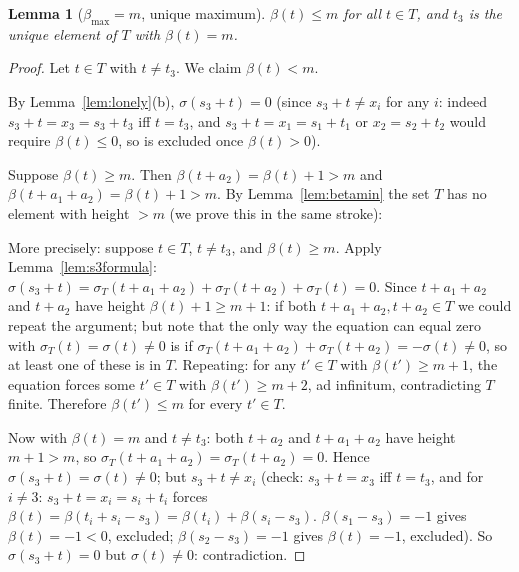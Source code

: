 \documentclass{article}
\newtheorem{lemma}{Lemma}
\begin{document}
\begin{lemma}[$\beta_{\max}=m$, unique maximum]\label{lem:betamax}
$\beta(t)\le m$ for all $t\in T$, and $t_3$ is the \emph{unique} element of $T$
with $\beta(t)=m$.
\end{lemma}
\begin{proof}
Let $t\in T$ with $t\ne t_3$.  We claim $\beta(t)<m$.

By Lemma~\ref{lem:lonely}(b), $\sigma(s_3+t)=0$
(since $s_3+t\ne x_i$ for any $i$: indeed $s_3+t=x_3=s_3+t_3$ iff $t=t_3$, and
$s_3+t=x_1=s_1+t_1$ or $x_2=s_2+t_2$ would require $\beta(t)\le 0$, so is
excluded once $\beta(t)>0$).

Suppose $\beta(t)\ge m$.  Then $\beta(t+a_2)=\beta(t)+1>m$ and
$\beta(t+a_1+a_2)=\beta(t)+1>m$.  By Lemma~\ref{lem:betamin} the
set $T$ has no element with height $>m$ (we prove this in the same stroke):

More precisely: suppose $t\in T$, $t\ne t_3$, and $\beta(t)\ge m$.
Apply Lemma~\ref{lem:s3formula}: $\sigma(s_3+t)=\sigma_T(t+a_1+a_2)+\sigma_T(t+a_2)+\sigma_T(t)=0$.
Since $t+a_1+a_2$ and $t+a_2$ have height $\beta(t)+1\ge m+1$:
if both $t+a_1+a_2,t+a_2\in T$ we could repeat the argument;
but note that the only way the equation can equal zero with $\sigma_T(t)=\sigma(t)\ne 0$ is
if $\sigma_T(t+a_1+a_2)+\sigma_T(t+a_2)=-\sigma(t)\ne 0$, so at least one of these is in $T$.
Repeating: for any $t'\in T$ with $\beta(t')\ge m+1$, the equation forces some
$t'\in T$ with $\beta(t')\ge m+2$, ad infinitum, contradicting $T$ finite.
Therefore $\beta(t')\le m$ for every $t'\in T$.

Now with $\beta(t)=m$ and $t\ne t_3$: both $t+a_2$ and $t+a_1+a_2$ have height $m+1>m$,
so $\sigma_T(t+a_1+a_2)=\sigma_T(t+a_2)=0$.
Hence $\sigma(s_3+t)=\sigma(t)\ne 0$; but $s_3+t\ne x_i$ (check: $s_3+t=x_3$ iff $t=t_3$,
and for $i\ne 3$: $s_3+t=x_i=s_i+t_i$ forces $\beta(t)=\beta(t_i+s_i-s_3)=\beta(t_i)+\beta(s_i-s_3)$.
$\beta(s_1-s_3)=-1$ gives $\beta(t)=-1<0$, excluded; $\beta(s_2-s_3)=-1$ gives $\beta(t)=-1$, excluded).
So $\sigma(s_3+t)=0$ but $\sigma(t)\ne 0$: contradiction.
\end{proof}
\end{document}
